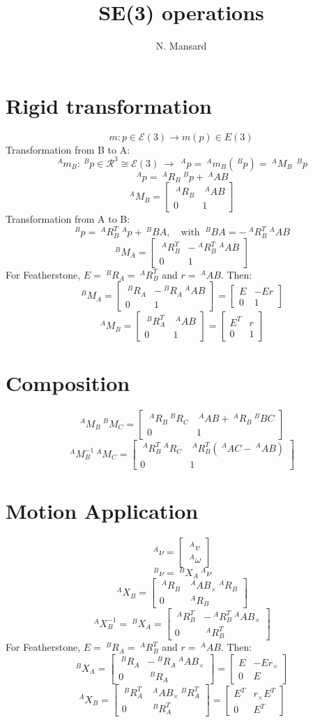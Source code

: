 \documentclass[11pt,twoside,a4paper]{article}
\newcommand{\BIN}{\begin{bmatrix}}
\newcommand{\BOUT}{\end{bmatrix}}
\newcommand{\calR}{\mathcal{R}}
\newcommand{\calE}{\mathcal{E}}
\newcommand{\repr}{\cong}
\newcommand{\aRb}{\ {}^{A}R_B}
\newcommand{\aMb}{\ {}^{A}M_B}
\newcommand{\amb}{\ {}^{A}m_B}
\newcommand{\apb}{{\ {}^{A}{AB}{}}}
\newcommand{\aXb}{\ {}^{A}X_B}
\newcommand{\bRa}{\ {}^{B}R_A}
\newcommand{\bMa}{\ {}^{B}M_A}
\newcommand{\bpa}{\ {}^{B}{BA}{}}
\newcommand{\bXa}{\ {}^{B}X_A}
\newcommand{\ap}{\ {}^{A}p}
\newcommand{\bp}{\ {}^{B}p}
\newcommand{\avs}{\ {}^{A}\nu}
\newcommand{\bvs}{\ {}^{B}\nu}
\newcommand{\w}{\omega}
\newcommand{\av}{\ {}^{A}v}
\newcommand{\aw}{\ {}^{A}\w}
\newcommand{\aMc}{\ {}^{A}M_C}
\newcommand{\aRc}{\ {}^{A}R_C}
\newcommand{\apc}{\ {}^{A}{AC}{}}
\newcommand{\bRc}{\ {}^{B}R_C}
\newcommand{\bMc}{\ {}^{B}M_C}
\newcommand{\bpc}{\ {}^{B}{BC}{}}
\begin{document}
\title{SE(3) operations}
\author{N. Mansard}
\date{}
\maketitle

\section{Rigid transformation}
$$m : p \in \calE(3) \rightarrow m(p) \in E(3)$$
Transformation from B to A:
$$\amb : \bp \in \calR^3 \repr \calE(3) \ \rightarrow\ \ap = \amb(\bp) = \aMb\ \bp$$
$$ \ap = \aRb \bp +  \apb$$
$$\aMb = \BIN \aRb & \apb \\ 0 & 1 \BOUT $$
Transformation from A to B:
$$\bp = \aRb^T \ap + \bpa, \quad\textrm{with }\bpa = - \aRb^T \apb$$
$$\bMa = \BIN \aRb^T & - \aRb^T \apb \\ 0 & 1 \BOUT $$
For Featherstone, $E = \bRa =\aRb^T$ and $r = \apb$. Then:
$$\bMa = \BIN \bRa & -\bRa \apb \\ 0 & 1 \BOUT = \BIN E & -E r \\ 0 & 1 \BOUT $$
$$\aMb = \BIN \bRa^T & \apb \\ 0 & 1 \BOUT = \BIN E^T & r \\ 0 & 1 \BOUT $$

\section{Composition}
$$ \aMb \bMc = \BIN \aRb \bRc & \apb +  \aRb \bpc \\ 0 & 1 \BOUT $$
$$ \aMb^{-1} \aMc = \BIN \aRb^T \aRc & \aRb^T (\apc - \apb) \\ 0 & 1 \BOUT $$



\section{Motion Application}
$$\avs = \BIN \av \\ \aw \BOUT$$
$$\bvs = \bXa\avs$$
$$ \aXb =  \BIN \aRb & \apb_\times \aRb \\ 0 & \aRb \BOUT $$
$$ \aXb^{-1} = \bXa =  \BIN \aRb^T & -\aRb^T \apb_\times \\ 0 & \aRb^T \BOUT $$
For Featherstone, $E = \bRa =\aRb^T$ and $r = \apb$. Then:
$$ \bXa = \BIN \bRa & - \bRa \apb_\times \\ 0 & \bRa \BOUT = \BIN E & -E r_\times \\ 0 & E \BOUT$$
$$ \aXb = \BIN \bRa^T & \apb_\times \bRa^T \\ 0 & \bRa^T \BOUT = \BIN E^T & r_\times E^T \\ 0 & E^T \BOUT$$ 
\end{document}
